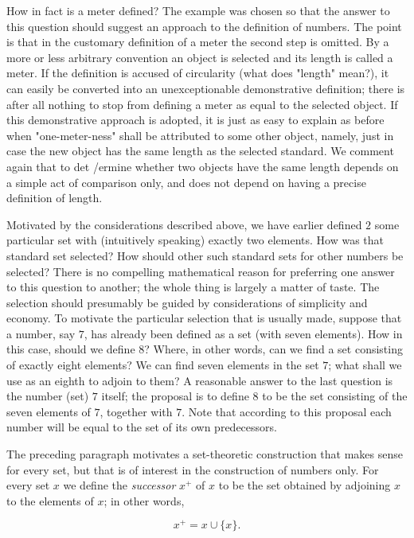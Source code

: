 How in fact is a meter defined? The example was chosen so that the answer to this question should suggest an approach to the definition of numbers. The point is that in the customary definition of a meter the second step is omitted. By a more or less arbitrary convention an object is selected and its length is called a meter. If the definition is accused of circularity (what does "length" mean?), it can easily be converted into an unexceptionable demonstrative definition; there is after all nothing to stop from defining a meter as equal to the selected object. If this demonstrative approach is adopted, it is just as easy to explain as before when "one-meter-ness" shall be attributed to some other object, namely, just in case the new object has the same length as the selected standard. We comment again that to det /ermine whether two  objects have the same length depends on a simple act of comparison only, and does not depend on having a precise definition of length. 

Motivated by the considerations described above, we have earlier defined $2$ some particular set with (intuitively speaking) exactly two elements. How was that standard set selected? How should other such standard sets for other numbers be selected? There is no compelling mathematical reason for preferring one answer to this question to another; the whole thing is largely a matter of taste. The selection should presumably be guided by considerations of simplicity and economy. To motivate the particular selection that is usually made, suppose that a number, say $7$, has already been defined as a set (with seven elements). How in this case, should we define $8$? Where, in other words, can we find a set consisting of exactly eight elements? We can find seven elements in the set $7$; what shall we use as an eighth to adjoin to them? A reasonable answer to the last question is the number (set) $7$ itself; the proposal is to define $8$ to be the set consisting of the seven elements of $7$, together with $7$. Note that according to this proposal each number will be equal to the set of its own predecessors. 

The preceding paragraph motivates a set-theoretic construction that makes sense for every set, but that is of interest in the construction of numbers only. For every set $x$ we define the \textit{successor} $x^{+}$ of $x$ to be the set obtained by adjoining $x$ to the elements of $x$; in other words,

\begin{equation*}
x^{+} = x \cup \{ x \}.
\end{equation*}

